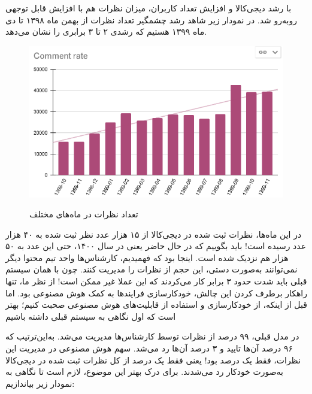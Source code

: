 با رشد دیجی‌کالا و افزایش تعداد کاربران، میزان نظرات هم با افزایش قابل توجهی روبه‌رو شد. در نمودار زیر شاهد رشد چشمگیر تعداد نظرات از بهمن ماه ۱۳۹۸ تا دی ماه ۱۳۹۹ هستیم که رشدی ۲ تا ۳ برابری را نشان می‌دهد.

\begin{figure}[H]
\centering
\caption{تعداد نظرات در ماه‌های مختلف}\label{}
\includegraphics[width=15cm]{figs/comment_rate.png}
\label{fig:test}
\end{figure}

در این ماه‌ها، نظرات ثبت شده در دیجی‌کالا از ۱۵ هزار عدد نظر ثبت شده به ۴۰ هزار عدد رسیده است! باید بگوییم که در حال حاضر یعنی در سال ۱۴۰۰، حتی این عدد به ۵۰ هزار هم نزدیک شده است. اینجا بود که فهمیدیم، کارشناس‌ها واحد تیم محتوا دیگر نمی‌توانند به‌صورت دستی، این حجم از نظرات را مدیریت کنند. چون با همان سیستم قبلی باید شدت حدود ۳ برابر کار می‌کردند که این عملا غیر ممکن است!
از نظر ما، تنها راهکار برطرف کردن این چالش، خودکارسازی فرایندها به کمک هوش مصنوعی بود. اما قبل از اینکه، از خودکارسازی و استفاده از قابلیت‌های هوش مصنوعی صحبت کنیم؛ بهتر است که اول نگاهی به سیستم قبلی داشته باشیم

در مدل قبلی، ۹۹ درصد از نظرات توسط کارشناس‌ها مدیریت می‌شد. به‌این‌ترتیب که ۹۶ درصد آن‌ها تایید و ۳ درصد آن‌ها رد می‌شد. سهم هوش مصنوعی در مدیریت این نظرات، فقط یک درصد بود! یعنی فقط یک درصد از کل نظرات ثبت شده در دیجی‌کالا به‌صورت خودکار رد می‌شدند.
برای درک بهتر این موضوع، لازم است تا نگاهی به نمودار زیر بیاندازیم:


